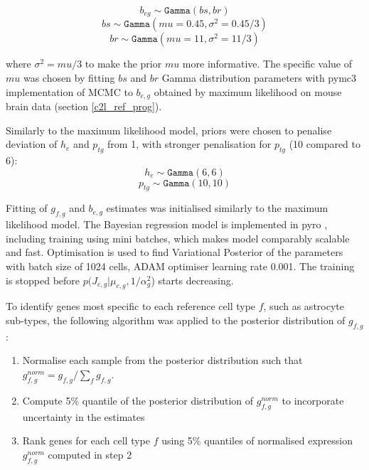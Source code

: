 \documentclass[11pt,a4paper]{article}
\begin{document}
\begin{equation} \label{eq:c2l_ref_prog_diff:5}
b_{eg} \sim \mathtt{Gamma}(bs, br)
\end{equation}
\begin{equation} \label{eq:c2l_ref_prog_diff:6}
bs \sim \mathtt{Gamma}(mu=0.45, \sigma^2=0.45/3)
\end{equation}
\begin{equation} \label{eq:c2l_ref_prog_diff:7}
br \sim \mathtt{Gamma}(mu=11, \sigma^2=11/3)
\end{equation}

where $\sigma^2 = mu / 3$ to make the prior $mu$ more informative. The specific value of $mu$ was chosen by fitting $bs$ and $br$ Gamma distribution parameters with pymc3 implementation of MCMC to $b_{e,g}$ obtained by maximum likelihood on mouse brain data (section \ref{c2l_ref_prog}).

Similarly to the maximum likelihood model, priors were chosen to penalise deviation of $h_e$ and $p_{tg}$ from 1, with stronger penalisation for $p_{tg}$ (10 compared to 6):
\begin{equation} \label{eq:c2l_ref_prog_diff:8}
h_e \sim \mathtt{Gamma}(6, 6)
\end{equation}
\begin{equation} \label{eq:c2l_ref_prog_diff:9}
p_{tg} \sim \mathtt{Gamma}(10, 10)
\end{equation}

Fitting of $g_{f,g}$ and $b_{e,g}$ estimates was initialised similarly to the maximum likelihood model. The Bayesian regression model is implemented in pyro \autocite{bingham_pyro_2018}, including training using mini batches, which makes model comparably scalable and fast. Optimisation is used to find Variational Posterior of the parameters with batch size of 1024 cells, ADAM optimiser learning rate 0.001. The training is stopped before $p(J_{c,g} | \mu_{c,g}, 1 / \alpha_g^2$) starts decreasing. \newline

To identify genes most specific to each reference cell type $f$, such as astrocyte sub-types, the following algorithm was applied to the posterior distribution of $g_{f,g}$:
\begin{enumerate}
    \item Normalise each sample from the posterior distribution such that $g^{norm}_{f,g} = g_{f,g} / \sum_{f} g_{f,g}$.
    \item Compute 5\% quantile of the posterior distribution of $g^{norm}_{f,g}$ to incorporate uncertainty in the estimates
    \item Rank genes for each cell type $f$ using 5\% quantiles of normalised expression $g^{norm}_{f,g}$ computed in step 2
\end{enumerate}
\end{document}
